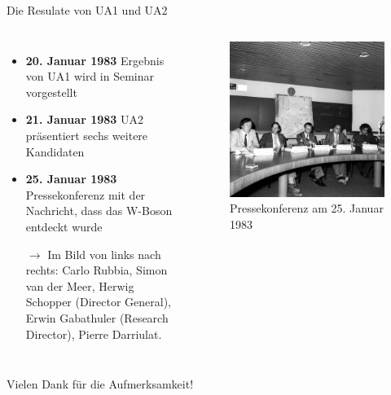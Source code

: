 \documentclass[aspectratio=1610, professionalfonts, 10pt]{beamer}
\begin{document}
\begin{frame}{Die Resulate von UA1 und UA2}
	\begin{columns}
				\begin{itemize}
					\setlength\itemsep{0.5em}
					\vspace*{-20px}
					\item \textbf{20. Januar 1983} Ergebnis von UA1 wird in Seminar vorgestellt
					\item \textbf{21. Januar 1983} UA2 präsentiert sechs weitere Kandidaten
					\item \textbf{25. Januar 1983} Pressekonferenz mit der Nachricht, dass das W-Boson entdeckt wurde
					\item[$\rightarrow$] Im Bild von links nach rechts: Carlo Rubbia, Simon van der Meer, Herwig Schopper (Director General), Erwin Gabathuler (Research Director), Pierre Darriulat.
				\end{itemize}
			\begin{figure}
	  			\centering
				\includegraphics[width=0.85\linewidth]{Images/8301243}
				\caption{Pressekonferenz am 25. Januar 1983 \cite{CERN-HI-8301243}}
	  			\label{fig:sad}
			\end{figure}
	\end{columns}
\end{frame}
%

\begin{frame}[focus]
	Vielen Dank für die Aufmerksamkeit!
\end{frame}
\end{document}
